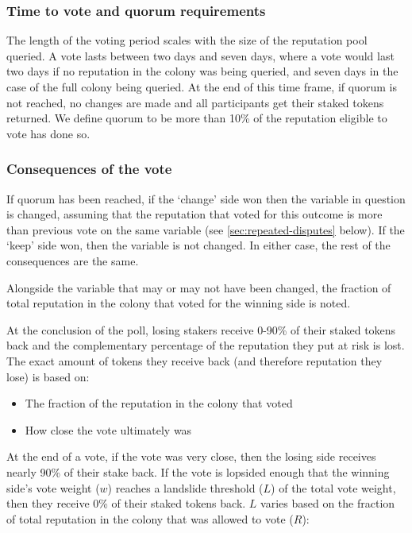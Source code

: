 \subsubsection{Time to vote and quorum requirements}
The length of the voting period scales with the size of the reputation pool queried. A vote lasts between two days and seven days, where a vote would last two days if no reputation in the colony was being queried, and seven days in the case of the full colony being queried. At the end of this time frame, if quorum is not reached, no changes are made and all participants get their staked tokens returned. We define quorum to be more than 10\% of the reputation eligible to vote has done so.

\subsubsection{Consequences of the vote}
If quorum has been reached, if the `change' side won then the variable in question is changed, assuming that the reputation that voted for this outcome is more than previous vote on the same variable (see \ref{sec:repeated-disputes} below). If the `keep' side won, then the variable is not changed. In either case, the rest of the consequences are the same.

Alongside the variable that may or may not have been changed, the fraction of total reputation in the colony that voted for the winning side is noted. 

At the conclusion of the poll, losing stakers receive 0-90\% of their staked tokens back and the complementary percentage of the reputation they put at risk is lost. The exact amount of tokens they receive back (and therefore reputation they lose) is based on:

\begin{itemize}
 \item The fraction of the reputation in the colony that voted
 \item How close the vote ultimately was
\end{itemize}

At the end of a vote, if the vote was very close, then the losing side receives nearly 90\% of their stake back. If the vote is lopsided enough that the winning side's vote weight ($w$) reaches a landslide threshold ($L$) of the total vote weight, then they receive 0\% of their staked tokens back. $L$ varies based on the fraction of total reputation in the colony that was allowed to vote ($R$):


